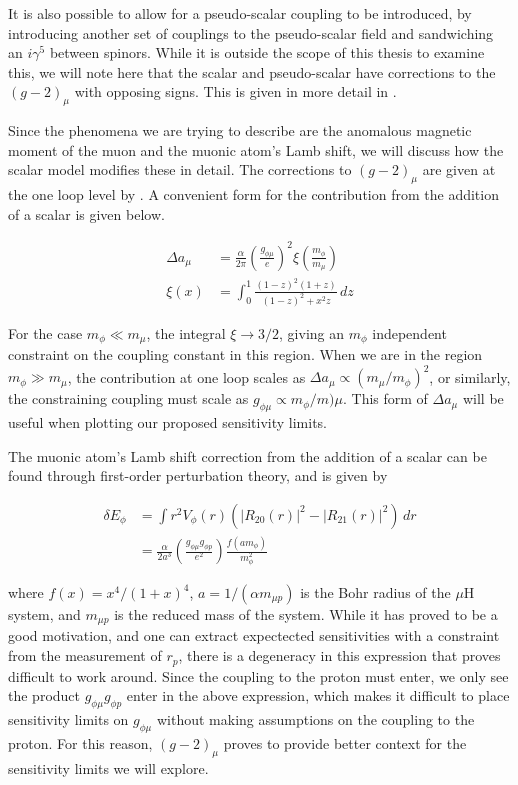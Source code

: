 It is also possible to allow for a pseudo-scalar coupling to be introduced, by introducing another set of couplings to the pseudo-scalar field and sandwiching an $i\gamma^5$ between spinors.
While it is outside the scope of this thesis to examine this, we will note here that the scalar and pseudo-scalar have corrections to the $(g-2)_\mu$ with opposing signs.
This is given in more detail in \cite{Carlson:2015jba}.

Since the phenomena we are trying to describe are the anomalous magnetic moment of the muon and the muonic atom's Lamb shift, we will discuss how the scalar model modifies these in detail.
The corrections to $(g-2)_\mu$ are given at the one loop level by \cite{Leveille:1977rc, McKeen:2009ny, TuckerSmith:2010ra}.
A convenient form for the contribution from the addition of a scalar is given below.

\begin{align}
    \Delta a_\mu &= \frac{\alpha}{2\pi} \left(\frac{g_{\phi\mu}}{e}\right)^2 \xi\left(\frac{m_\phi}{m_\mu}\right) \\
    \xi(x) &= \int_0^1 \frac{(1-z)^2(1+z)}{(1-z)^2 + x^2z} \,dz
\end{align}

\noindent For the case $m_\phi \ll m_\mu$, the integral $\xi \rightarrow 3/2$, giving an $m_\phi$ independent constraint on the coupling constant in this region.
When we are in the region $m_\phi \gg m_\mu$, the contribution at one loop scales as $\Delta a_\mu \propto (m_\mu/m_\phi)^2$, or similarly, the constraining coupling must scale as $g_{\phi\mu} \propto m_\phi / m)\mu$.
This form of $\Delta a_\mu$ will be useful when plotting our proposed sensitivity limits.

The muonic atom's Lamb shift correction from the addition of a scalar can be found through first-order perturbation theory, and is given by \cite{TuckerSmith:2010ra, Carlson:2015jba}

\begin{align}
    \delta E_\phi &= \int r^2 V_\phi(r)\left(\left|R_{20}(r)\right|^2 - \left|R_{21}(r)\right|^2\right)\,dr \\
                  &= \frac{\alpha}{2 a^3} \left(\frac{g_{\phi\mu} g_{\phi p}}{e^2}\right) \frac{f(a m_\phi)}{m_\phi^2}
\end{align}

\noindent where $f(x) = x^4/(1+x)^4$, $a = 1/(\alpha m_{\mu p})$ is the Bohr radius of the $\mu\textrm{H}$ system, and $m_{\mu p}$ is the reduced mass of the system.
While it has proved to be a good motivation, and one can extract expectected sensitivities with a constraint from the measurement of $r_p$, there is a degeneracy in this expression that proves difficult to work around.
Since the coupling to the proton must enter, we only see the product $g_{\phi\mu} g_{\phi p}$ enter in the above expression, which makes it difficult to place sensitivity limits on $g_{\phi\mu}$ without making assumptions on the coupling to the proton.
For this reason, $(g-2)_\mu$ proves to provide better context for the sensitivity limits we will explore.
